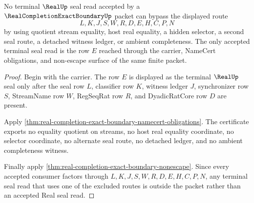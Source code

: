 \begin{theorem}
\label{thm:real-completion-exact-boundary-real-seal-nonescape}
No terminal $\RealUp$ seal read accepted by a $\RealCompletionExactBoundaryUp$ packet can bypass the displayed route
$$
L,K,J,S,W,R,D,E,H,C,P,N
$$
by using quotient stream equality, host real equality, a hidden selector, a second seal route, a detached witness ledger, or ambient completeness. The only accepted terminal seal read is the row $E$ reached through the carrier, NameCert obligations, and non-escape surface of the same finite packet.
\end{theorem}
\begin{proof}
Begin with the carrier. The row $E$ is displayed as the terminal $\RealUp$ seal only after the seal row $L$, classifier row $K$, witness ledger $J$, synchronizer row $S$, StreamName row $W$, RegSeqRat row $R$, and DyadicRatCore row $D$ are present.

Apply \autoref{thm:real-completion-exact-boundary-namecert-obligations}. The certificate exports no equality quotient on streams, no host real equality coordinate, no selector coordinate, no alternate seal route, no detached ledger, and no ambient completeness witness.

Finally apply \autoref{thm:real-completion-exact-boundary-nonescape}. Since every accepted consumer factors through $L,K,J,S,W,R,D,E,H,C,P,N$, any terminal seal read that uses one of the excluded routes is outside the packet rather than an accepted Real seal read.
\end{proof}

